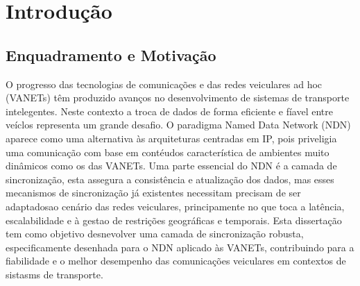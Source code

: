 
%


\chapter{Introdução}
\label{cha:introdução}



\section{Enquadramento e Motivação}
\label{sec:enquadramento_motivação}

O progresso das tecnologias de comunicações e das redes veiculares ad hoc (VANETs) têm produzido avanços no desenvolvimento de sistemas de transporte intelegentes. Neste contexto a troca de dados de forma eficiente e fíavel entre veíclos representa um grande desafio.
O paradigma Named Data Network (NDN) aparece como uma alternativa às arquiteturas centradas em IP, 
pois priveligia uma comunicação com base em contéudos característica de ambientes muito dinâmicos como os das \gls{VANETs}.
Uma parte essencial do \gls{NDN} é a camada de sincronização, esta assegura a consistência e atualização dos dados, mas esses mecanismos de sincronização já existentes necessitam precisam de ser adaptadosao cenário das redes veiculares, principamente no que toca a latência, escalabilidade e à gestao de restrições geográficas e temporais.
Esta dissertação tem como objetivo desnevolver uma camada de sincronização robusta, especificamente desenhada para o \gls{NDN} aplicado às \gls{VANETs}, contribuindo para a fiabilidade e o melhor desempenho das comunicações veiculares em contextos de sistasms de transporte.




